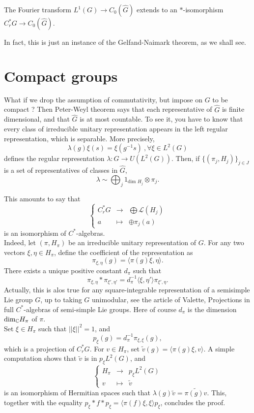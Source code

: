 \begin{thm}
The Fourier transform $L^1(G)\rightarrow C_0(\hat G)$ extends to an $*$-isomorphism $C_r^*G\rightarrow C_0(\hat G)$.
\end{thm}

In fact, this is just an instance of the Gelfand-Naimark theorem, as we shall see.

\section{Compact groups}

What if we drop the assumption of commutativity, but impose on $G$ to be compact ? Then Peter-Weyl theorem says that each representative of $\hat G$ is finite dimensional, and that $\hat G$ is at most countable. To see it, you have to know that every class of irreducible unitary representation appears in the left regular representation, which is separable. More precisely, 
\[\lambda(g)\xi (s)= \xi(g^{-1} s)\ , \forall \xi\in L^2(G)\]
defines the regular representation $\lambda : G\rightarrow U(L^2(G))$. Then, if $\{(\pi_j,H_j)\}_{j\in J}$ is a set of representatives of classes in $\hat G$, 
\[\lambda \sim \bigoplus_j 1_{\text{dim }H_j} \otimes \pi_j.\]

This amounts to say that  
\[\left\{
\begin{array}{rcl}
C^*_rG & \rightarrow & \bigoplus \mathcal L(H_j)\\
a & \mapsto & \oplus \pi_j(a)
\end{array}
\right.\]
 is an isomorphism of $C^*$-algebras.\\

Indeed, let $(\pi, H_\pi)$ be an irreducible unitary representation of $G$. For any two vectors $\xi, \eta\in H_\pi$, define the coefficient of the representation as 
\[\pi_{\xi,\eta}(g)=\langle\pi(g)\xi,\eta\rangle.\]
There exists a unique positive constant $d_\pi$ such that 
\[\pi_{\xi,\eta}\ast \pi_{\xi',\eta'} = d_\pi^{-1}\langle \xi, \eta'\rangle\pi_{\xi',\eta}.\]
Actually, this is alos true for any square-integrable representation of a semisimple Lie group $G$, up to taking $G$ unimodular, see the article of Valette, Projections in full $C^*$-algebras of semi-simple Lie groups. Here of course $d_\pi$ is the dimension $\text{dim}_\mathbb C H_\pi$ of $\pi$.\\
 
Set $\xi \in H_\pi$ such that $||\xi||^2=1$, and
\[p_\xi(g)=d_\pi^{-1}\pi_{\xi,\xi}(g),\]
which is a projection of $C^*_rG$. For $v\in H_\pi$, set $\tilde v(g)=\langle \pi(g)\xi,v \rangle$. A simple computation shows that $\tilde v$ is in $p_\xi L^2(G)$, and 
\[\left\{\begin{array}{rcl} H_\pi & \rightarrow & p_\xi L^2(G) \\ v & \mapsto & \tilde v\end{array}\right.\]
is an isomorphism of Hermitian spaces such that $\lambda(g)\tilde v = \tilde{\pi(g)v}$. This, together with the equality $p_\xi \ast f \ast p_\xi = \langle\pi(f)\xi,\xi\rangle p_\xi$, concludes the proof.

